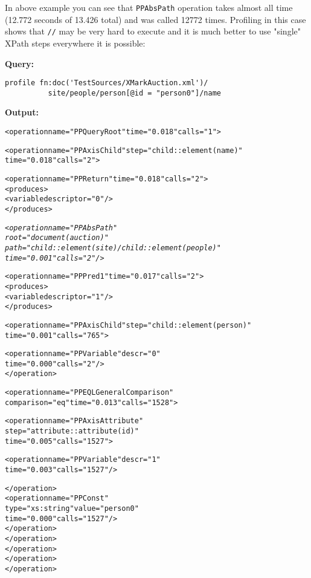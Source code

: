 \documentclass[a4paper,12pt]{article}
\begin{document}
In above example you can see that \verb!PPAbsPath! operation takes almost all
time (12.772 seconds of 13.426 total) and was called 12772 times. Profiling in
this case shows that \verb!//! may be very hard to execute and it is much better
to use "single" XPath steps everywhere it is possible:

\medskip
\noindent
\textbf{Query:}
\begin{verbatim}
profile fn:doc('TestSources/XMarkAuction.xml')/
          site/people/person[@id = "person0"]/name
\end{verbatim}

\medskip
\noindent
\textbf{Output:}

\small{
\begin{alltt}
<operation name="PPQueryRoot" time="0.018" calls="1">

  <operation name="PPAxisChild" step="child::element(name)" 
                                time="0.018" calls="2">
  
    <operation name="PPReturn" time="0.018" calls="2">
      <produces>
        <variable descriptor="0"/>
      </produces>

      \emph{<operation name="PPAbsPath" 
                 root="document(auction)" 
                 path="child::element(site)/child::element(people)"
                 time="0.001" calls="2"/>}

      <operation name="PPPred1" time="0.017" calls="2">
        <produces>
          <variable descriptor="1"/>
        </produces>
        
        <operation name="PPAxisChild" step="child::element(person)" 
                                      time="0.001" calls="765">

          <operation name="PPVariable" descr="0"
                     time="0.000" calls="2"/>
        </operation>

        <operation name="PPEQLGeneralComparison"
                   comparison="eq" time="0.013" calls="1528">
                   
          <operation name="PPAxisAttribute" 
                     step="attribute::attribute(id)" 
                     time="0.005" calls="1527">

            <operation name="PPVariable" descr="1" 
                       time="0.003" calls="1527"/>
                       
          </operation>
          <operation name="PPConst"
                     type="xs:string" value="person0"
                     time="0.000" calls="1527"/>
        </operation>
      </operation>
    </operation>
  </operation>
</operation>
\end{alltt}}
\end{document}
